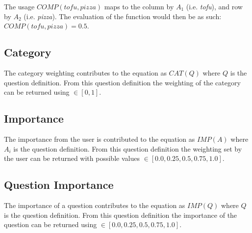 The usage $COMP(tofu, pizza)$ maps to the column by $A_1$ (i.e. \textit{tofu}), and row by $A_2$ (i.e. \textit{pizza}). The evaluation of the function would then be as such: $COMP(tofu, pizza) = 0.5$.

\subsection{Category}
\label{sec:score_category}

The category weighting contributes to the equation as $CAT(Q)$ where $Q$ is the question definition. From this question definition the weighting of the category can be returned using $\in [0, 1]$.

\subsection{Importance}
\label{sec:score_importance}

The importance from the user is contributed to the equation as $IMP(A)$ where $A_i$ is the question definition. From this question definition the weighting set by the user can be returned with possible values $\in [ 0.0, 0.25, 0.5, 0.75, 1.0 ]$.

\subsection{Question Importance}
\label{sec:scoreq_qimp}

The importance of a question contributes to the equation as $IMP(Q)$ where $Q$ is the question definition. From this question definition the importance of the question can be returned using $\in [ 0.0, 0.25, 0.5, 0.75, 1.0 ]$.